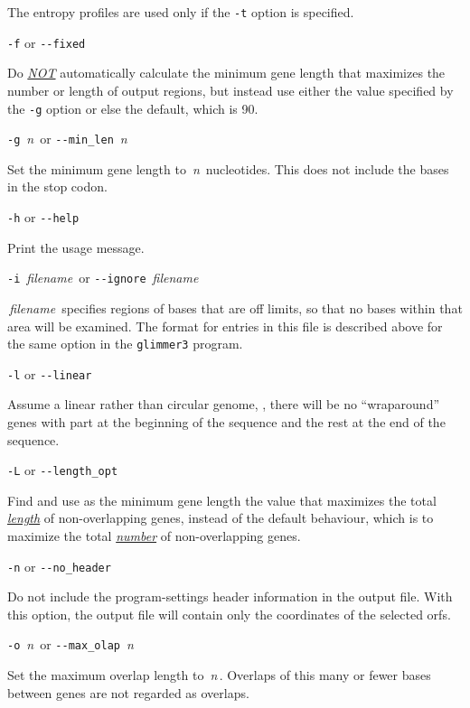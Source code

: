 \documentclass[fleqn,titlepage,11pt]{article}
\def\Desc#1{\,\mbox{\emph{#1}}\,}
\def\Pg#1{\texttt{#1}}
\begin{document}
  The entropy profiles are used only if the \Pg{-t} option is specified.

\exdent
  \verb`-f` \enskip or \enskip \verb`--fixed`

  Do \underline{\emph{NOT}} automatically calculate the minimum gene
  length that maximizes the number or length of output regions, but
  instead use either the value specified by the \Pg{-g} option or
  else the default, which is 90.

\exdent
  \verb`-g` \Desc{n} \enskip or \enskip \verb`--min_len` \Desc{n}

  Set the minimum gene length to \Desc{n} nucleotides.  This does not include
  the bases in the stop codon.

\exdent
  \verb`-h` \enskip or \enskip \verb`--help`

  Print the usage message.

\exdent
  \verb`-i` \Desc{filename} \enskip or \enskip \verb`--ignore` \Desc{filename}

  \Desc{filename} specifies regions of bases that are off 
  limits, so that no bases within that area will be examined.
  The format for entries in this file is described above for
  the same option in the \Pg{glimmer3} program.

\exdent
  \verb`-l` \enskip or \enskip \verb`--linear`

  Assume a linear rather than circular genome, \ie, there will
  be no ``wraparound'' genes with part at the beginning of the sequence
  and the rest at the end of the sequence.

\exdent
  \verb`-L` \enskip or \enskip \verb`--length_opt`

  Find and use as the minimum gene length the value that maximizes the
  total \underline{\emph{length}} of non-overlapping genes, instead of
  the default behaviour, which is to maximize the total \underline{\emph{number}}
  of non-overlapping genes.

\exdent
  \verb`-n` \enskip or \enskip \verb`--no_header`

  Do not include the program-settings header information in the
  output file.  With this option, the output file will contain
  only the coordinates of the selected orfs.

\exdent
  \verb`-o` \Desc{n} \enskip or \enskip \verb`--max_olap` \Desc{n}

  Set the maximum overlap length to \Desc{n}.  Overlaps of this
  many or fewer bases between genes are not regarded as overlaps.
\end{document}
